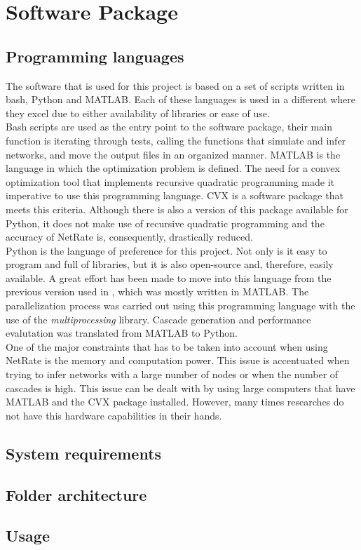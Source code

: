 
\chapter{Software Package}

\section{Programming languages}

The software that is used for this project is based on a set of scripts written in bash, Python and MATLAB. Each of these languages is used in a different where they excel due to either availability of libraries or ease of use. \\

Bash scripts are used as the entry point to the software package, their main function is iterating through tests, calling the functions that simulate and infer networks, and move the output files in an organized manner.
MATLAB is the language in which the optimization problem is defined. The need for a convex optimization tool that implements recursive quadratic programming made it imperative to use this programming language. CVX is a software package that meets this criteria. Although there is also a version of this package available for Python, it does not make use of recursive quadratic programming and the accuracy of NetRate is, consequently, drastically reduced.\\

Python is the language of preference for this project. Not only is it easy to program and full of libraries, but it is also open-source and, therefore, easily available. A great effort has been made to move into this language from the previous version used in \cite{alexandru2018estimating}, which was mostly written in MATLAB. 
The parallelization process was carried out using this programming language with the use of the \textit{multiprocessing} library. Cascade generation and performance evalutation was translated from MATLAB to Python.\\

One of the major constraints that has to be taken into account when using NetRate is the memory and computation power. This issue is accentuated when trying to infer networks with a large number of nodes or when the number of cascades is high. This issue can be dealt with by using large computers that have MATLAB and the CVX package installed. However, many times researches do not have this hardware capabilities in their hands.  

\section{System requirements}
\section{Folder architecture}
\section{Usage}
